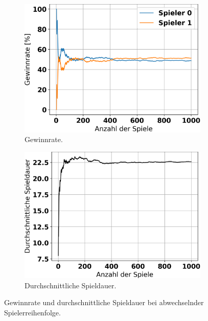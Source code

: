 \begin{figure}[ht!]%
	\begin{subfigure}[b]{0.48\textwidth}
		\includegraphics[width=\textwidth]{Bilder/random_vs_random_alternating_player_order_graph_win_rates.png}
		\caption{Gewinnrate.}
		\label{fig:f3}
	\end{subfigure}
	\hfill
	\begin{subfigure}[b]{0.48\textwidth}
		\includegraphics[width=\textwidth]{Bilder/random_vs_random_alternating_player_order_graph_game_length.png}
		\caption{Durchschnittliche Spieldauer.}
		\label{fig:f4}
	\end{subfigure}
	\caption{Gewinnrate und durchschnittliche Spieldauer bei abwechselnder Spielerreihenfolge.}
\end{figure}



